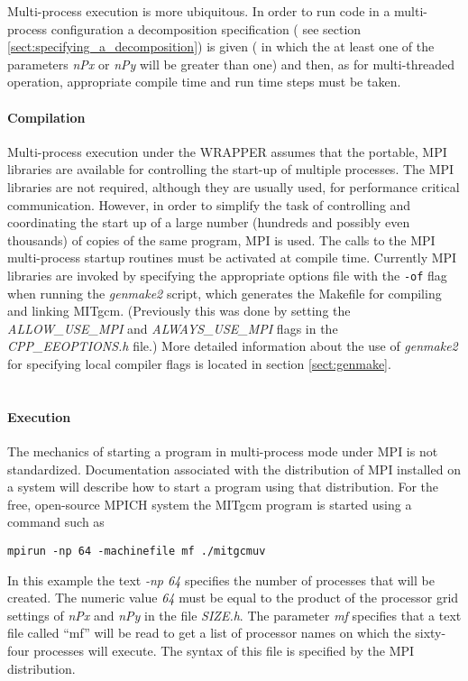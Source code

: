 Multi-process execution is more ubiquitous.
In order to run code in a multi-process configuration a decomposition
specification ( see section \ref{sect:specifying_a_decomposition})
is given ( in which the at least one of the
parameters {\em nPx} or {\em nPy} will be greater than one)
and then, as for multi-threaded operation,
appropriate compile time and run time steps must be taken.

\paragraph{Compilation} Multi-process execution under the WRAPPER 
assumes that the portable, MPI libraries are available
for controlling the start-up of multiple processes. The MPI libraries
are not required, although they are usually used, for performance
critical communication. However, in order to simplify the task
of controlling and coordinating the start up of a large number
(hundreds and possibly even thousands) of copies of the same 
program, MPI is used. The calls to the MPI multi-process startup
routines must be activated at compile time.  Currently MPI libraries are 
invoked by
specifying the appropriate options file with the 
{\tt-of} flag when running the {\em genmake2} 
script, which generates the Makefile for compiling and linking MITgcm.
(Previously this was done by setting the {\em ALLOW\_USE\_MPI} and 
{\em ALWAYS\_USE\_MPI} flags in the {\em CPP\_EEOPTIONS.h} file.)  More
detailed information about the use of {\em genmake2} for specifying 
local compiler flags is located in section \ref{sect:genmake}.\\  


 \\
\paragraph{\bf Execution} The mechanics of starting a program in 
multi-process mode under MPI is not standardized. Documentation 
associated with the distribution of MPI installed on a system will
describe how to start a program using that distribution.
For the free, open-source MPICH system the MITgcm program is started
using a command such as
\begin{verbatim}
mpirun -np 64 -machinefile mf ./mitgcmuv
\end{verbatim}
In this example the text {\em -np 64} specifies the number of processes 
that will be created. The numeric value {\em 64} must be equal to the
product of the processor grid settings of {\em nPx} and {\em nPy}
in the file {\em SIZE.h}. The parameter {\em mf} specifies that a text file
called ``mf'' will be read to get a list of processor names on
which the sixty-four processes will execute. The syntax of this file
is specified by the MPI distribution.
\\ 

